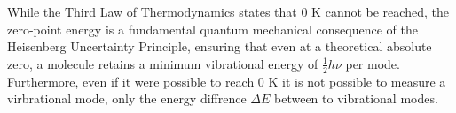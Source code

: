 \documentclass[a4paper,12pt]{scrartcl}
\begin{document}
While the Third Law of Thermodynamics states that $0\text{ K}$ cannot be reached, the zero-point energy is a fundamental quantum mechanical consequence of the Heisenberg Uncertainty Principle, ensuring that even at a theoretical absolute zero, a molecule retains a minimum vibrational energy of $\frac{1}{2} h\nu$ per mode. Furthermore, even if it were possible to reach 0 K it is not possible to measure a virbrational mode, only the energy diffrence $ \Delta E$ between to vibrational modes.
\end{document}
